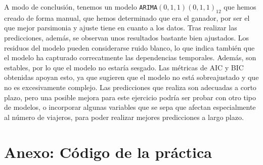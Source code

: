 \documentclass[a4paper,onecolumn]{extarticle}
\let\stdsection\section
\renewcommand\section{\newpage\stdsection}
\begin{document}
\begin{sloppypar}
A modo de conclusión, tenemos un modelo \texttt{ARIMA$(0,1,1)(0,1,1)_{12}$} que hemos creado de forma manual, que hemos determinado que era el ganador, por ser 
el que mejor parsimonia y ajuste tiene en cuanto a los datos. Tras realizar las predicciones, además, se observan unos resultados bastante bien ajustados. Los 
residuos del modelo pueden considerarse ruido blanco, lo que indica también que el modelo ha capturado correcatmente las dependencias temporales. Además, son 
estables, por lo que el modelo no estaría sesgado. Las métricas de AIC y BIC obtenidas apoyan esto, ya que sugieren que el modelo no está sobreajustado y que no 
es excesivamente complejo. Las predicciones que realiza son adecuadas a corto plazo, pero una posible mejora para este ejercicio podría ser probar con otro tipo 
de modelos, o incorporar algunas variables que se sepa que afectan especialmente al número de viajeros, para poder realizar mejores predicciones a largo plazo.

\clearpage
\newpage

\appendix
\section{Anexo: Código de la práctica}\label{anexo1}

\end{sloppypar}
\end{document}
